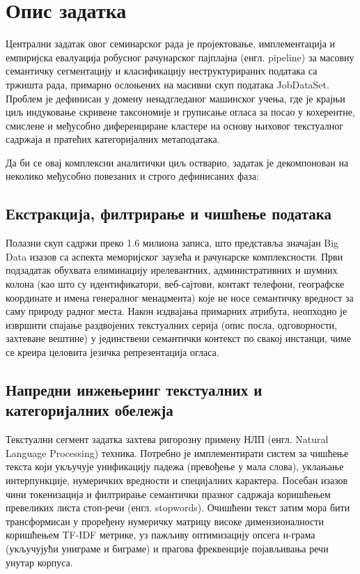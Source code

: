 \documentclass[a4paper,12pt]{report}
\begin{document}
	
	\chapter{Опис задатка} 
	Централни задатак овог семинарског рада је пројектовање, имплементација и емпиријска евалуација робусног рачунарског пајплајна (енгл. pipeline) за масовну семантичку сегментацију и класификацију неструктурираних података са тржишта рада, примарно ослоњених на масивни скуп података JobDataSet. Проблем је дефинисан у домену ненадгледаног машинског учења, где је крајњи циљ индуковање скривене таксономије и груписање огласа за посао у кохерентне, смислене и међусобно диференциране кластере на основу њиховог текстуалног садржаја и пратећих категоријалних метаподатака.
	
	Да би се овај комплексни аналитички циљ остварио, задатак је декомпонован на неколико међусобно повезаних и строго дефинисаних фаза:
	
	\section{Екстракција, филтрирање и чишћење података}
	Полазни скуп садржи преко 1.6 милиона записа, што представља значајан Big Data изазов са аспекта меморијског заузећа и рачунарске комплексности. Први подзадатак обухвата елиминацију ирелевантних, административних и шумних колона (као што су идентификатори, веб-сајтови, контакт телефони, географске координате и имена генералног менаџмента) које не носе семантичку вредност за саму природу радног места. Након издвајања примарних атрибута, неопходно је извршити спајање раздвојених текстуалних серија (опис посла, одговорности, захтеване вештине) у јединствени семантички контекст по свакој инстанци, чиме се креира целовита језичка репрезентација огласа.
	
	\section{Напредни инжењеринг текстуалних и категоријалних обележја}
	Текстуални сегмент задатка захтева ригорозну примену НЛП (енгл. Natural Language Processing) техника. Потребно је имплементирати систем за чишћење текста који укључује унификацију падежа (превођење у мала слова), уклањање интерпункције, нумеричких вредности и специјалних карактера. Посебан изазов чини токенизација и филтрирање семантички празног садржаја коришћењем превеликих листа стоп-речи (енгл. stopwords). Очишћени текст затим мора бити трансформисан у проређену нумеричку матрицу високе димензионалности коришћењем TF-IDF метрике, уз пажљиву оптимизацију опсега н-грама (укључујући униграме и биграме) и прагова фреквенције појављивања речи унутар корпуса.
	
\end{document}
